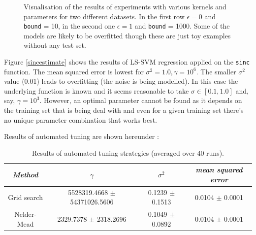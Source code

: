 \begin{figure}[h]
\qquad
{}\qquad
\caption{Visualisation of the results of experiments with various kernels and parameters for two different datasets. In the first row $\epsilon=0$ and \texttt{bound} = 10, in the second one $\epsilon=1$ and \texttt{bound} = 1000. Some of the models are likely to be overfitted though these are just toy examples without any test set.}
\label{functionestimation}
\end{figure}


Figure \ref{sincestimate} shows the results of LS-SVM regression applied on the \texttt{sinc} function. The mean squared error is lowest for $\sigma^2=1.0,\gamma=10^6$. The smaller $\sigma^2$ value (0.01) leads to overfitting (the noise is being modelled). In this case the underlying function is known and it seems reasonable to take $\sigma\in[0.1,1.0]$ and, say, $\gamma=10^3$. However, an optimal parameter cannot be found as it depends on the training set that is being deal with and even for a given training set there's no unique parameter combination that works best.

\par Results of automated tuning are shown hereunder :

\begin{table}[h]
\centering
\begin{tabular}{c|ccc}
\textit{Method} & $\gamma$ & $\sigma^2$ & \textit{mean squared error} \\
\hline
Grid search & 5528319.4668 $\pm$ 54371026.5606 & 0.1239 $\pm$  0.1513 & 0.0104 $\pm$ 0.0001\\
Nelder-Mead & 2329.7378 $\pm$ 2318.2696 & 0.1049 $\pm$ 0.0892 &  0.0104 $\pm$ 0.0001\\
\end{tabular}
\caption{Results of automated tuning strategies (averaged over 40 runs).}
\label{automatedtuning}
\end{table}

